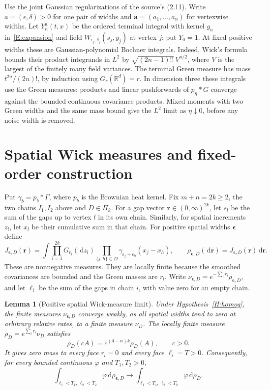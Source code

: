 \documentclass[12pt,oneside,openany]{book}
\makeatletter
\let\lean@pending\@empty
\newcommand{\LeanMarker}[1]{\gdef\lean@pending{#1}}
\numberwithin{equation}{section}
\newtheorem{lemma}[theorem]{Lemma}
\theoremstyle{nogostyle}
\theoremstyle{definition}
\newcommand{\R}{\mathbb{R}}
\newcommand{\ud}{\,\mathrm{d}}
\makeatother
\begin{document}


Use the joint Gaussian regularizations of the source's (2.11). Write $a =
(\epsilon,\delta) > 0$ for one pair of widths and $\boldsymbol a =
(a_1,\ldots,a_n)$ for vertexwise widths. Let $Y_n^{\boldsymbol a}(t,x)$ be the
ordered terminal integral with kernel $g_n$ in~\eqref{E:expansion} and field
$W_{\epsilon_j,\delta_j}(s_j,y_j)$ at vertex $j$; put $Y_0 = 1$. At fixed
positive widths these are Gaussian-polynomial Bochner integrals. Indeed, Wick's
formula bounds their product integrands in $L^2$ by $\sqrt{(2n-1)!!}\,V^{n/2}$,
where $V$ is the largest of the finitely many field variances. The terminal
Green measure has mass $t^{2n}/(2n)!$, by induction using $G_r(\R^d) = r$. In
dimension three these integrals use the Green measures: products and linear
pushforwards of $p_\eta*G$ converge against the bounded continuous covariance
products. Mixed moments with two Green widths and the same mass bound give the
$L^2$ limit as $\eta\downarrow0$, before any noise width is removed.

\section{Spatial Wick measures and fixed-order construction}

Put $\gamma_b = p_b*\Gamma$, where $p_b$ is the Brownian heat kernel. Fix $m+n =
2k \ge 2$, the two chains $I_1,I_2$ above and $D \in \Pi_k$. For a gap vector
$\boldsymbol r \in (0,\infty)^{2k}$, let $s_l$ be the sum of the gaps up to
vertex $l$ in its own chain. Similarly, for spatial increments $z_l$, let $x_l$
be their cumulative sum in that chain. For positive spatial widths
$\boldsymbol\epsilon$ define
\[
  J_{\boldsymbol\epsilon,D}(\boldsymbol r)
  =\int\prod_{l=1}^{2k}G_{r_l}(\ud z_l)
  \prod_{\{j,h\}\in D}
  \gamma_{\epsilon_j+\epsilon_h}(x_j-x_h),\qquad
  \rho_{\boldsymbol\epsilon,D}(\ud\boldsymbol r)
  =J_{\boldsymbol\epsilon,D}(\boldsymbol r)\ud\boldsymbol r.
\]
These are nonnegative measures. They are locally finite because the smoothed
covariances are bounded and the Green masses are $r_l$. Write
$\nu_{\boldsymbol\epsilon,D} = e^{-\sum_l r_l} \rho_{\boldsymbol\epsilon,D}$,
and let $\ell_i$ be the sum of the gaps in chain $i$, with value zero for an
empty chain.
\LeanMarker{L:spatial-wick-measures}%
\begin{lemma}[Positive spatial Wick-measure limit]\label{L:spatial-wick-measures}
  Under Hypothesis~\ref{H:homog}, the finite measures
  $\nu_{\boldsymbol\epsilon,D}$ converge weakly, as all spatial widths tend to
  zero at arbitrary relative rates, to a finite measure $\nu_D$. The locally
  finite measure $\rho_D = e^{\sum_l r_l}\nu_D$ satisfies
  \[
    \rho_D(cA)=c^{(4-\alpha)k}\rho_D(A),\qquad c>0.
  \]
  It gives zero mass to every face $r_l = 0$ and every face $\ell_i = T > 0$.
  Consequently, for every bounded continuous $\varphi$ and $T_1,T_2 > 0$,
  \begin{equation}\label{E:spatial-wick-limit}
    \int_{\ell_1<T_1,\,\ell_2<T_2}\varphi\ud\rho_{\boldsymbol\epsilon,D}
    \longrightarrow
    \int_{\ell_1<T_1,\,\ell_2<T_2}\varphi\ud\rho_D.
  \end{equation}
\end{lemma}
\end{document}

